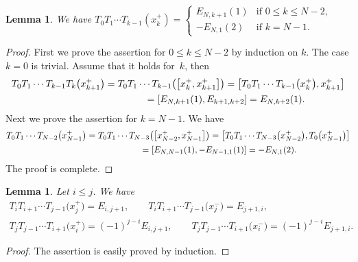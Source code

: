 \documentclass[10pt,a4paper]{amsart}
\newtheorem{lem}[thm]{Lemma}
\theoremstyle{definition}
\numberwithin{equation}{section}
\begin{document}
\begin{lem}\label{lem:0_to_k}We have $T_0 T_1 \cdots T_{k-1} (x_k^+) = \begin{cases}
E_{N,k+1}(1) & \text{if $0 \leq k \leq N-2$},\\
-E_{N,1}(2) & \text{if $k=N-1$}.
\end{cases}$
\end{lem}
\begin{proof} First we prove the assertion for $0 \leq k \leq N-2$ by induction on $k$. The case $k=0$ is trivial. Assume that it holds for~$k$, then
\begin{gather*}
T_0 T_1 \cdots T_{k-1} T_{k} \big(x_{k+1}^+\big) = T_0 T_1 \cdots T_{k-1} \big(\big[x_{k}^+, x_{k+1}^+\big]\big) = \big[T_0 T_1 \cdots T_{k-1}\big(x_{k}^+\big), x_{k+1}^+\big] \\
\hphantom{T_0 T_1 \cdots T_{k-1} T_{k} \big(x_{k+1}^+\big)}{} = [E_{N,k+1}(1), E_{k+1,k+2}] = E_{N,k+2}(1).
\end{gather*}
Next we prove the assertion for $k=N-1$. We have
\begin{gather*}
T_0 T_1 \cdots T_{N-2} \big(x_{N-1}^+\big) = T_0 T_1 \cdots T_{N-3} \big(\big[x_{N-2}^+, x_{N-1}^+\big]\big) = \big[T_0 T_1 \cdots T_{N-3}\big(x_{N-2}^+\big), T_0\big(x_{N-1}^+\big)\big] \\
\hphantom{T_0 T_1 \cdots T_{N-2} \big(x_{N-1}^+\big)}{} = [E_{N,N-1}(1), -E_{N-1,1}(1)] = -E_{N,1}(2).
\end{gather*}
The proof is complete.
\end{proof}

\begin{lem}Let $i \leq j$. We have
\begin{gather}
T_{i} T_{i+1} \cdots T_{j-1} \big(x_{j}^+\big) = E_{i,j+1},\qquad T_{i} T_{i+1} \cdots T_{j-1} \big(x_{j}^-\big) = E_{j+1,i}, \label{eq:increase}\\
T_{j} T_{j-1} \cdots T_{i+1} \big(x_{i}^+\big) = (-1)^{j-i}E_{i,j+1},\qquad T_{j} T_{j-1} \cdots T_{i+1} \big(x_{i}^-\big) = (-1)^{j-i}E_{j+1,i}. \label{eq:decrease}
\end{gather}
\end{lem}
\begin{proof}The assertion is easily proved by induction.
\end{proof}
\end{document}
